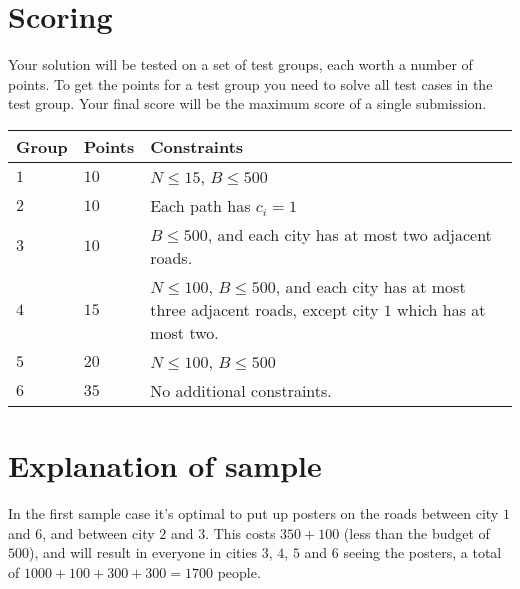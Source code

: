 \section*{Scoring}
Your solution will be tested on a set of test groups, each worth a number of points.
To get the points for a test group you need to solve all test cases in the test group. Your final score will be the maximum score of a single submission.

\noindent
\begin{tabular}{| l | l | p{10cm} |}
\hline
Group & Points & Constraints \\ \hline
$1$   & $10$         & $N \le 15$, $B \le 500$ \\ \hline
$2$   & $10$         & Each path has $c_i = 1$ \\ \hline
$3$   & $10$         & $B \le 500$, and each city has at most two adjacent roads. \\ \hline
$4$   & $15$         & $N \le 100$, $B \le 500$, and each city has at most three adjacent roads, except city $1$ which has at most two. \\ \hline
$5$   & $20$         & $N \le 100$, $B \le 500$ \\ \hline
$6$   & $35$         & No additional constraints. \\ \hline
\end{tabular}

\section*{Explanation of sample}
In the first sample case it's optimal to put up posters on the roads between city $1$ and $6$, and between city $2$ and $3$.
This costs $350 + 100$ (less than the budget of $500$), and will result in everyone in cities $3$, $4$, $5$ and $6$ seeing the posters, a total of $1000 + 100 + 300 + 300 = 1700$ people.
